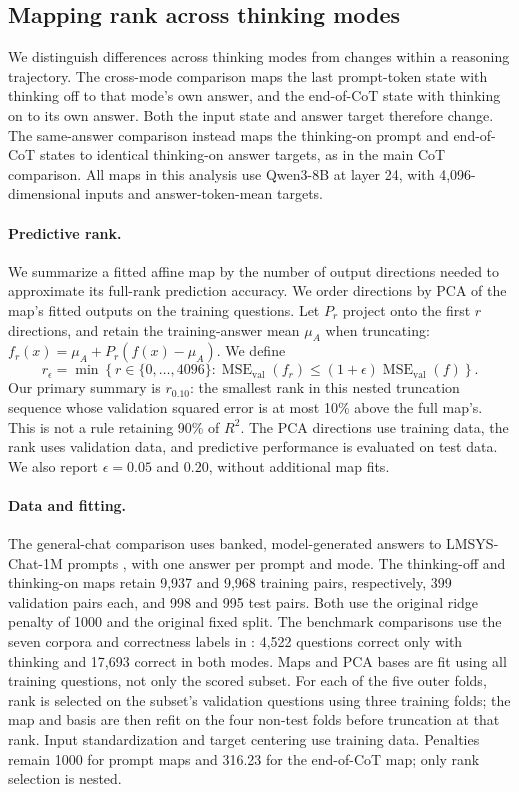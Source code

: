 \subsection{Mapping rank across thinking modes}
\label{app:cot-rank}

We distinguish differences across thinking modes from changes within a reasoning
trajectory. The cross-mode comparison maps the last prompt-token state with
thinking off to that mode's own answer, and the end-of-CoT state with thinking on
to its own answer. Both the input state and answer target therefore change.
The same-answer comparison instead maps the thinking-on prompt and end-of-CoT
states to identical thinking-on answer targets, as in the main CoT comparison.
All maps in this analysis use Qwen3-8B at layer 24, with 4,096-dimensional inputs
and answer-token-mean targets.

\paragraph{Predictive rank.}
We summarize a fitted affine map by the number of output directions needed to
approximate its full-rank prediction accuracy. We order directions by PCA of
the map's fitted outputs on the training questions. Let $P_r$ project onto the
first $r$ directions, and retain the training-answer mean $\mu_A$ when truncating:
$f_r(x)=\mu_A+P_r(f(x)-\mu_A)$. We define
\[
 r_{\epsilon}=\min\left\{r\in\{0,\ldots,4096\}:
 \operatorname{MSE}_{\mathrm{val}}(f_r)
 \leq (1+\epsilon)\operatorname{MSE}_{\mathrm{val}}(f)\right\}.
\]
Our primary summary is $r_{0.10}$: the smallest rank in this nested truncation
sequence whose validation squared error is at most 10\% above the full map's.
This is not a rule retaining 90\% of $R^2$. The PCA directions use training data,
the rank uses validation data, and predictive performance is evaluated on test
data. We also report $\epsilon=0.05$ and $0.20$, without additional map fits.

\paragraph{Data and fitting.}
The general-chat comparison uses banked, model-generated answers to
LMSYS-Chat-1M prompts \citep{zheng2024lmsyschat}, with one answer per prompt and
mode. The thinking-off and thinking-on maps retain 9,937 and 9,968 training
pairs, respectively, 399 validation pairs each, and 998 and 995 test pairs.
Both use the original ridge penalty of 1000 and the original fixed split.
The benchmark comparisons use the seven corpora and correctness labels in
: 4,522 questions correct only with thinking and 17,693
correct in both modes. Maps and PCA bases are fit using all training questions,
not only the scored subset. For each of the five outer folds, rank is selected
on the subset's validation questions using three training folds; the map and
basis are then refit on the four non-test folds before truncation at that rank. Input
standardization and target centering use training data. Penalties remain 1000
for prompt maps and 316.23 for the end-of-CoT map; only rank selection is nested.

